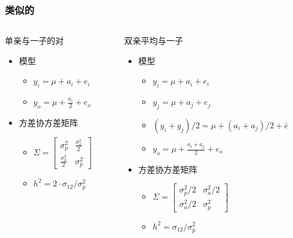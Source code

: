 \documentclass[serif,aspectratio=169]{beamer}
\begin{document}
\begin{frame}
  \frametitle{类似的}
  \begin{columns}
    \begin{column}{.5\textwidth}
      \begin{block}{单亲与一子的对}
        \begin{itemize}
        \item 模型
          \begin{itemize}
          \item $y_i=\mu+a_i+e_i$
          \item $y_o=\mu+\frac{a_i}{2}+e_o$
          \end{itemize}
        \item 方差协方差矩阵
          \begin{itemize}
          \item $\Sigma=\left[\begin{array}{cc}\sigma_p^2&\frac{\sigma_a^2}{2}\\\frac{\sigma_a^2}{2}&\sigma_p^2\end{array}\right]$
          \item $h^2=2\cdot\sigma_{12}/\sigma_p^2$
          \end{itemize}
        \end{itemize}
      \end{block}
    \end{column}

    \begin{column}{.5\textwidth}
      \begin{block}{双亲平均与一子}
        \begin{itemize}
        \item 模型
          \begin{itemize}
          \item $y_i=\mu+a_i+e_i$
          \item $y_j=\mu+a_j+e_j$
          \item $(y_i+y_j)/2 = \mu+(a_i+a_j)/2+\bar{e}$
          \item $y_o=\mu+\frac{a_i+a_j}{2}+e_o$
          \end{itemize}
        \item 方差协方差矩阵
          \begin{itemize}
          \item $\Sigma=\left[\begin{array}{cc}\sigma_p^2/2&\sigma_a^2/2\\\sigma_a^2/2&\sigma_p^2\end{array}\right]$
          \item $h^2=\sigma_{12}/\sigma_{\bar{p}}^2$
          \end{itemize}
        \end{itemize}
      \end{block}
    \end{column}
  \end{columns}
\end{frame}
\end{document}
